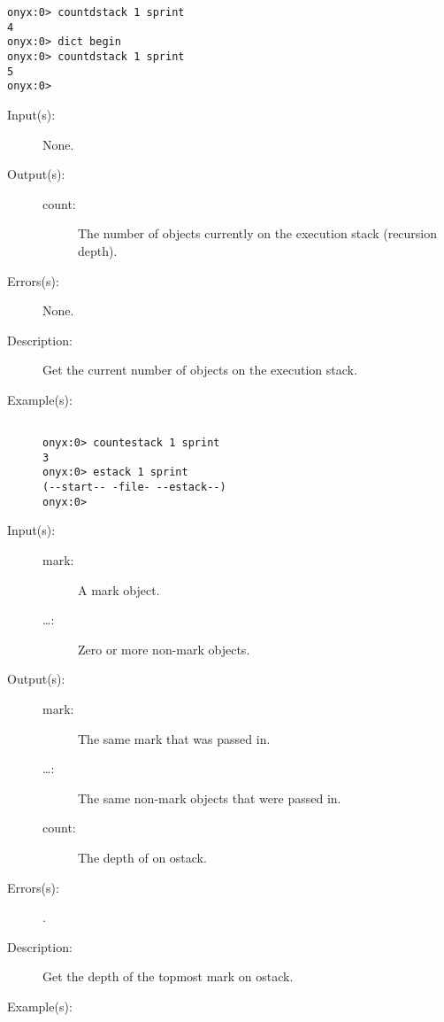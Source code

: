 \begin{description}
\begin{description}
\begin{verbatim}
onyx:0> countdstack 1 sprint
4
onyx:0> dict begin
onyx:0> countdstack 1 sprint
5
onyx:0>
		\end{verbatim}
	\end{description}
\label{systemdict:countestack}
\item[{\onyxop{--}{countestack}{count}}: ]
	\begin{description}\item[]
	\item[Input(s): ] None.
	\item[Output(s): ]
		\begin{description}\item[]
		\item[count: ]
			The number of objects currently on the execution stack
			(recursion depth).
		\end{description}
	\item[Errors(s): ] None.
	\item[Description: ]
		Get the current number of objects on the execution stack.
	\item[Example(s): ]\begin{verbatim}

onyx:0> countestack 1 sprint
3
onyx:0> estack 1 sprint
(--start-- -file- --estack--)
onyx:0>
		\end{verbatim}
	\end{description}
\label{systemdict:counttomark}
\item[{\onyxop{mark \dots}{counttomark}{mark \dots count}}: ]
	\begin{description}\item[]
	\item[Input(s): ]
		\begin{description}\item[]
		\item[mark: ]
			A mark object.
		\item[\dots: ]
			Zero or more non-mark objects.
		\end{description}
	\item[Output(s): ]
		\begin{description}\item[]
		\item[mark: ]
			The same mark that was passed in.
		\item[\dots: ]
			The same non-mark objects that were passed in.
		\item[count: ]
			The depth of  on ostack.
		\end{description}
	\item[Errors(s): ]
		\begin{description}\item[]
		\item[.]
		\end{description}
	\item[Description: ]
		Get the depth of the topmost mark on ostack.
	\item[Example(s): ]\begin{verbatim}


\end{verbatim}
\end{description}
\end{description}
